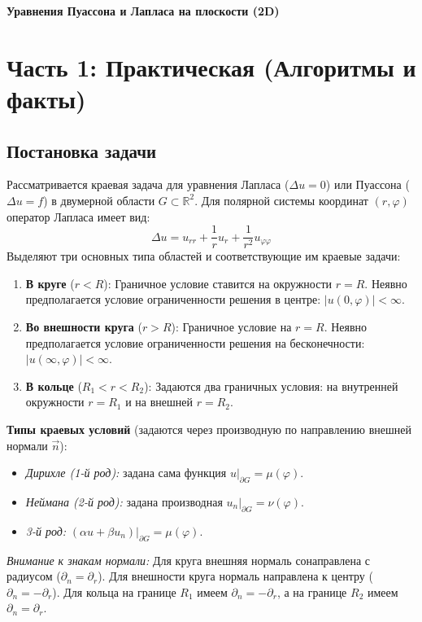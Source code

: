 \documentclass[a4paper,10pt]{article}
\begin{document}
\begin{center}
    \LARGE \textbf{Уравнения Пуассона и Лапласа на плоскости (2D)}
\end{center}

\section{Часть 1: Практическая (Алгоритмы и факты)}

\subsection*{Постановка задачи}
Рассматривается краевая задача для уравнения Лапласа ($\Delta u = 0$) или Пуассона ($\Delta u = f$) в двумерной области $G \subset \mathbb{R}^2$. Для полярной системы координат $(r, \varphi)$ оператор Лапласа имеет вид:
\[ \Delta u = u_{rr} + \frac{1}{r}u_r + \frac{1}{r^2}u_{\varphi\varphi} \]
Выделяют три основных типа областей и соответствующие им краевые задачи:
\begin{enumerate}
    \item \textbf{В круге} ($r < R$): Граничное условие ставится на окружности $r=R$. Неявно предполагается условие ограниченности решения в центре: $|u(0, \varphi)| < \infty$.
    \item \textbf{Во внешности круга} ($r > R$): Граничное условие на $r=R$. Неявно предполагается условие ограниченности решения на бесконечности: $|u(\infty, \varphi)| < \infty$.
    \item \textbf{В кольце} ($R_1 < r < R_2$): Задаются два граничных условия: на внутренней окружности $r=R_1$ и на внешней $r=R_2$.
\end{enumerate}

\textbf{Типы краевых условий} (задаются через производную по направлению внешней нормали $\vec{n}$):
\begin{itemize}
    \item \textit{Дирихле (1-й род):} задана сама функция $u|_{\partial G} = \mu(\varphi)$.
    \item \textit{Неймана (2-й род):} задана производная $u_n|_{\partial G} = \nu(\varphi)$.
    \item \textit{3-й род:} $(\alpha u + \beta u_n)|_{\partial G} = \mu(\varphi)$.
\end{itemize}
\textit{Внимание к знакам нормали:} Для круга внешняя нормаль сонаправлена с радиусом ($\partial_n = \partial_r$). Для внешности круга нормаль направлена к центру ($\partial_n = -\partial_r$). Для кольца на границе $R_1$ имеем $\partial_n = -\partial_r$, а на границе $R_2$ имеем $\partial_n = \partial_r$.
\end{document}
